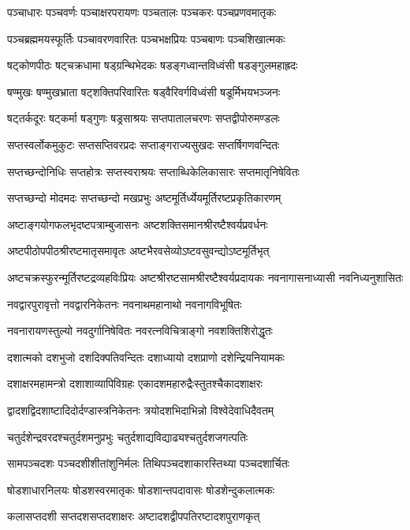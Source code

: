 \twolineshloka
{पञ्चाधारः पञ्चवर्णः पञ्चाक्षरपरायणः}
{पञ्चतालः पञ्चकरः पञ्चप्रणवमातृकः}

\twolineshloka
{पञ्चब्रह्ममयस्फूर्तिः पञ्चावरणवारितः}
{पञ्चभक्षप्रियः पञ्चबाणः पञ्चशिखात्मकः}

\twolineshloka
{षट्कोणपीठः षट्चक्रधामा षड्ग्रन्थिभेदकः}
{षडङ्गध्वान्तविध्वंसी षडङ्गुलमहाह्रदः}

\twolineshloka
{षण्मुखः षण्मुखभ्राता षट्शक्तिपरिवारितः}
{षड्वैरिवर्गविध्वंसी षडूर्मिभयभञ्जनः}

\twolineshloka
{षट्तर्कदूरः षट्कर्मा षड्गुणः षड्रसाश्रयः}
{सप्तपातालचरणः सप्तद्वीपोरुमण्डलः}

\twolineshloka
{सप्तस्वर्लोकमुकुटः सप्तसप्तिवरप्रदः}
{सप्ताङ्गराज्यसुखदः सप्तर्षिगणवन्दितः}

\twolineshloka
{सप्तच्छन्दोनिधिः सप्तहोत्रः सप्तस्वराश्रयः}
{सप्ताब्धिकेलिकासारः सप्तमातृनिषेवितः}

\twolineshloka
{सप्तच्छन्दो मोदमदः सप्तच्छन्दो मखप्रभुः}
{अष्टमूर्तिर्ध्येयमूर्तिरष्टप्रकृतिकारणम्}

\twolineshloka
{अष्टाङ्गयोगफलभृदष्टपत्राम्बुजासनः}
{अष्टशक्तिसमानश्रीरष्टैश्वर्यप्रवर्धनः}

\twolineshloka
{अष्टपीठोपपीठश्रीरष्टमातृसमावृतः}
{अष्टभैरवसेव्योऽष्टवसुवन्द्योऽष्टमूर्तिभृत्}

\threelineshloka
{अष्टचक्रस्फुरन्मूर्तिरष्टद्रव्यहविःप्रियः}
{अष्टश्रीरष्टसामश्रीरष्टैश्वर्यप्रदायकः}
{नवनागासनाध्यासी नवनिध्यनुशासितः}

\twolineshloka
{नवद्वारपुरावृत्तो नवद्वारनिकेतनः}
{नवनाथमहानाथो नवनागविभूषितः}

\twolineshloka
{नवनारायणस्तुल्यो नवदुर्गानिषेवितः}
{नवरत्नविचित्राङ्गो नवशक्तिशिरोद्धृतः}

\twolineshloka
{दशात्मको दशभुजो दशदिक्पतिवन्दितः}
{दशाध्यायो दशप्राणो दशेन्द्रियनियामकः}

\twolineshloka
{दशाक्षरमहामन्त्रो दशाशाव्यापिविग्रहः}
{एकादशमहारुद्रैःस्तुतश्चैकादशाक्षरः}

\twolineshloka
{द्वादशद्विदशाष्टादिदोर्दण्डास्त्रनिकेतनः}
{त्रयोदशभिदाभिन्नो विश्वेदेवाधिदैवतम्}

\twolineshloka
{चतुर्दशेन्द्रवरदश्चतुर्दशमनुप्रभुः}
{चतुर्दशाद्यविद्याढ्यश्चतुर्दशजगत्पतिः}

\twolineshloka
{सामपञ्चदशः पञ्चदशीशीतांशुनिर्मलः}
{तिथिपञ्चदशाकारस्तिथ्या पञ्चदशार्चितः}

\twolineshloka
{षोडशाधारनिलयः षोडशस्वरमातृकः}
{षोडशान्तपदावासः षोडशेन्दुकलात्मकः}

\twolineshloka
{कलासप्तदशी सप्तदशसप्तदशाक्षरः}
{अष्टादशद्वीपपतिरष्टादशपुराणकृत्}

